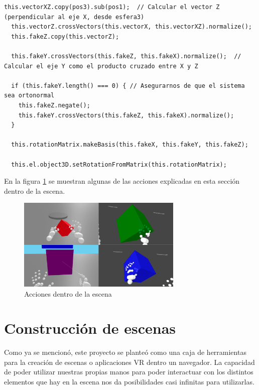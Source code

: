 \documentclass[a4paper, 12pt]{book}
\begin{document}
\begin{itemize}
\begin{lstlisting}[caption=Creación del falso eje de coordenadas, captionpos=b, label=lst:fake_coords]
  this.vectorXZ.copy(pos3).sub(pos1);  // Calcular el vector Z (perpendicular al eje X, desde esfera3)
  this.vectorZ.crossVectors(this.vectorX, this.vectorXZ).normalize();
  this.fakeZ.copy(this.vectorZ);

  this.fakeY.crossVectors(this.fakeZ, this.fakeX).normalize();  // Calcular el eje Y como el producto cruzado entre X y Z
  
  if (this.fakeY.length() === 0) { // Asegurarnos de que el sistema sea ortonormal
    this.fakeZ.negate();
    this.fakeY.crossVectors(this.fakeZ, this.fakeX).normalize();
  }
  
  this.rotationMatrix.makeBasis(this.fakeX, this.fakeY, this.fakeZ);
  
  this.el.object3D.setRotationFromMatrix(this.rotationMatrix); 
\end{lstlisting}
\end{itemize}

En la figura \ref{fig:mosaico} se muestran algunas de las acciones explicadas en esta sección dentro de la escena.
\begin{figure}[H] 
  \centering
  \includegraphics[width=0.7\textwidth]{img/colage.png} 
  \caption{Acciones dentro de la escena}
  \label{fig:mosaico}
\end{figure}

\section{Construcción de escenas}
\label{sec:escenas}

Como ya se mencionó, este proyecto se planteó como una caja de herramientas para la creación de escenas o aplicaciones VR dentro un navegador. La capacidad de poder utilizar nuestras propias manos para poder interactuar con los distintos elementos que hay en la escena nos da posibilidades casi infinitas para utilizarlas. 
\end{document}
